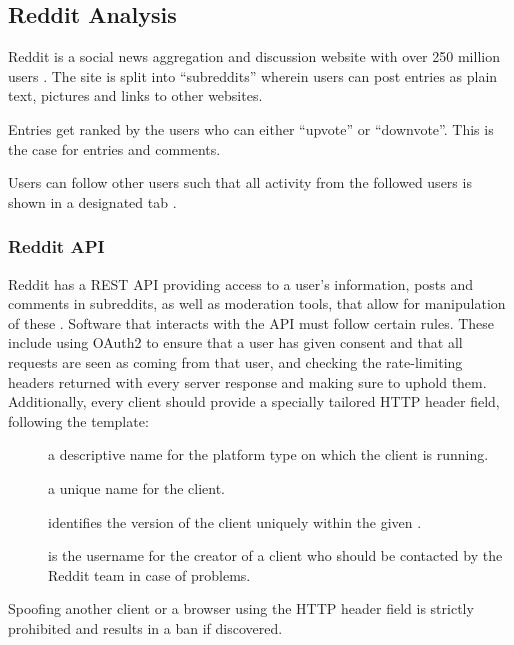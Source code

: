\subsection{Reddit Analysis}\label{sec:reddit-analysis}
Reddit is a social news aggregation and discussion website with over 250 million
users \citep{AdvertiseOnReddit}. The site is split into ``subreddits'' wherein
users can post entries as plain text, pictures and links to other websites. \nl

Entries get ranked by the users who can either ``upvote'' or ``downvote''. This
is the case for entries and comments. \citep{AboutReddit}\nl

Users can follow other users such that all activity from the followed users is
shown in a designated tab .

\subsubsection{Reddit API}\label{subsec:reddit-api}
Reddit has a \ac{REST} \ac{API} providing access to a user's information, posts
and comments in subreddits, as well as moderation tools, that allow for
manipulation of these \citep{RedditApi}. Software that interacts with the
\ac{API} must follow certain rules. These include using OAuth2 to ensure that a
user has given consent and that all requests are seen as coming from that
user, and checking the rate-limiting headers returned with every server response
and making sure to uphold them.
Additionally, every client should provide a specially tailored 
\ac{HTTP} header field, following the template: \citep{RedditApiRules}\nl

\begin{center}
\end{center}\nl
\begin{description}
  \item[] a descriptive name for the platform type on which the
  client is running.
  \item[] a unique name for the client.
  \item[] identifies the version of the client uniquely
  within the given .
  \item[] is the username for the creator of a client who
  should be contacted by the Reddit team in case of problems.
\end{description}\nl

Spoofing another client or a browser using the  \ac{HTTP} header
field is strictly prohibited and results in a ban if discovered.
\citep{RedditApiRules}\nl

